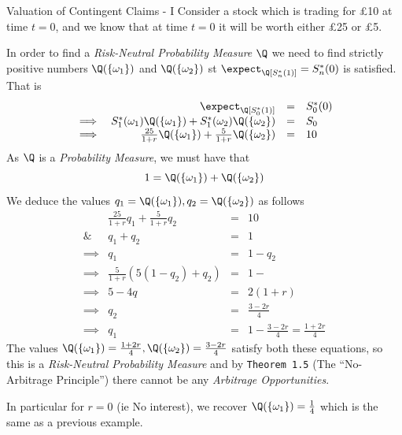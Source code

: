 \documentclass[11pt,a4paper]{article}
\begin{document}
  \begin{example}{Valuation of Contingent Claims - I}\label{ex_valuation_of_contingent_claims}
    Consider a stock which is trading for £10 at time $t=0$, and we know that at time $t=0$ it will be worth either £25 or £5.
    \par In order to find a \textit{Risk-Neutral Probability Measure} $\Q$ we need to find strictly positive numbers $\Q(\{\omega_1\})$ and $\Q(\{\omega_2\})$ st $\expect_\Q[S_n^*(1)]=S_n^*(0)$ is satisfied. That is
    \[\begin{array}{rrcl}
      &\expect_\Q[S_0^*(1)]&=&S_0^*(0)\\
      \implies&S_1^*(\omega_1)\Q(\{\omega_1\})+S_1^*(\omega_2)\Q(\{\omega_2\})&=&S_0\\
      \implies&\frac{25}{1+r}\Q(\{\omega_1\})+\frac5{1+r}\Q(\{\omega_2\})&=&10
    \end{array}\]
    As $\Q$ is a \textit{Probability Measure}, we must have that
    \[ 1=\Q(\{\omega_1\})+\Q(\{\omega_2\}) \]
    We deduce the values $q_1=\Q(\{\omega_1\}),q_2=\Q(\{\omega_2\})$ as follows
    \[\begin{array}{rrcl}
      &\frac{25}{1+r}q_1+\frac5{1+r}q_2&=&10\\
      \&&q_1+q_2&=&1\\
      \implies&q_1&=&1-q_2\\
      \implies&\frac5{1+r}\left(5(1-q_2)+q_2\right)&=&1-\\
      \implies&5-4q&=&2(1+r)\\
      \implies&q_2&=&\frac{3-2r}4\\
      \implies&q_1&=&1-\frac{3-2r}4=\frac{1+2r}4
    \end{array}\]
    The values $\Q(\{\omega_1\})=\frac{1+2r}4,\Q(\{\omega_2\})=\frac{3-2r}4$ satisfy both these equations, so this is a \textit{Risk-Neutral Probability Measure} and by \texttt{Theorem 1.5}  (The ``No-Arbitrage Principle'') there cannot be any \textit{Arbitrage Opportunities}.
    \par In particular for $r=0$ (ie No interest), we recover $\Q(\{\omega_1\})=\frac14$ which is the same as a previous example.
  \end{example}
\end{document}
